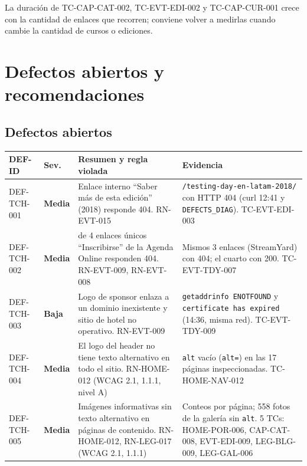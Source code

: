 \documentclass[11pt,a4paper]{article}
\newcommand{\sev}[1]{\textbf{#1}}
\newcommand{\code}[1]{\texttt{#1}}
\begin{document}
La duración de TC-CAP-CAT-002, TC-EVT-EDI-002 y TC-CAP-CUR-001 crece con la cantidad de enlaces que recorren; conviene volver a medirlas cuando cambie la cantidad de cursos o ediciones.

\clearpage
\section{Defectos abiertos y recomendaciones}

\subsection{Defectos abiertos}

\begin{center}\small
\begin{tabularx}{\textwidth}{@{}l l >{\raggedright\arraybackslash}X >{\raggedright\arraybackslash}p{}@{}}
\toprule
DEF-ID & Sev. & Resumen y regla violada & Evidencia \\
\midrule
DEF-TCH-001 & \sev{Media} & Enlace interno ``Saber más de esta edición'' (2018) responde 404. RN-EVT-015 & \nolinkurl{/testing-day-en-latam-2018/} con HTTP 404 (curl 12:41 y \code{DEFECTS\_DIAG}). TC-EVT-EDI-003 \\
\addlinespace
DEF-TCH-002 & \sev{Media} & 3 de 4 enlaces únicos ``Inscribirse'' de la Agenda Online responden 404. RN-EVT-009, RN-EVT-008 & Mismos 3 enlaces (StreamYard) con 404; el cuarto con 200. TC-EVT-TDY-007 \\
\addlinespace
DEF-TCH-003 & \sev{Baja} & Logo de sponsor enlaza a un dominio inexistente y sitio de hotel no operativo. RN-EVT-009 & \code{getaddrinfo ENOTFOUND} y \code{certificate has expired} (14:36, misma red). TC-EVT-TDY-009 \\
\addlinespace
DEF-TCH-004 & \sev{Media} & El logo del header no tiene texto alternativo en todo el sitio. RN-HOME-012 (WCAG 2.1, 1.1.1, nivel A) & \code{alt} vacío (\code{alt=\textquotedbl\textquotedbl}) en las 17 páginas inspeccionadas. TC-HOME-NAV-012 \\
\addlinespace
DEF-TCH-005 & \sev{Media} & Imágenes informativas sin texto alternativo en páginas de contenido. RN-HOME-012, RN-LEG-017 (WCAG 2.1, 1.1.1) & Conteos por página; 558 fotos de la galería sin \code{alt}. 5 TCs: HOME-POR-006, CAP-CAT-008, EVT-EDI-009, LEG-BLG-009, LEG-GAL-006 \\
\bottomrule
\end{tabularx}
\end{center}
\end{document}

